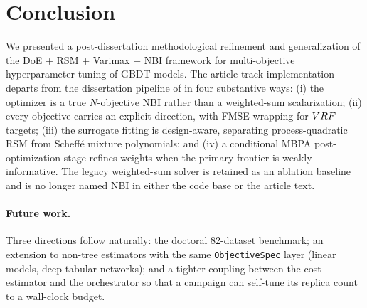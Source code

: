 \section{Conclusion}\label{sec:conclusion}

We presented a post-dissertation methodological refinement and
generalization of the DoE + RSM + Varimax + NBI framework for
multi-objective hyperparameter tuning of GBDT models. The article-track
implementation departs from the dissertation pipeline of
\citep{ribeiro2026dissertation} in four substantive ways:
(i) the optimizer is a true $N$-objective NBI rather than a
weighted-sum scalarization; (ii) every objective carries an explicit
direction, with FMSE wrapping for $VRF$ targets; (iii) the surrogate
fitting is design-aware, separating process-quadratic RSM from
Scheff\'{e} mixture polynomials; and (iv) a conditional MBPA
post-optimization stage refines weights when the primary frontier is
weakly informative. The legacy weighted-sum solver is retained as an
ablation baseline and is no longer named NBI in either the code base
or the article text.


\paragraph{Future work.} Three directions follow naturally:
the doctoral 82-dataset benchmark; an extension to non-tree
estimators with the same \texttt{ObjectiveSpec} layer
(linear models, deep tabular networks); and a tighter coupling
between the cost estimator and the orchestrator so that a campaign
can self-tune its replica count to a wall-clock budget.
